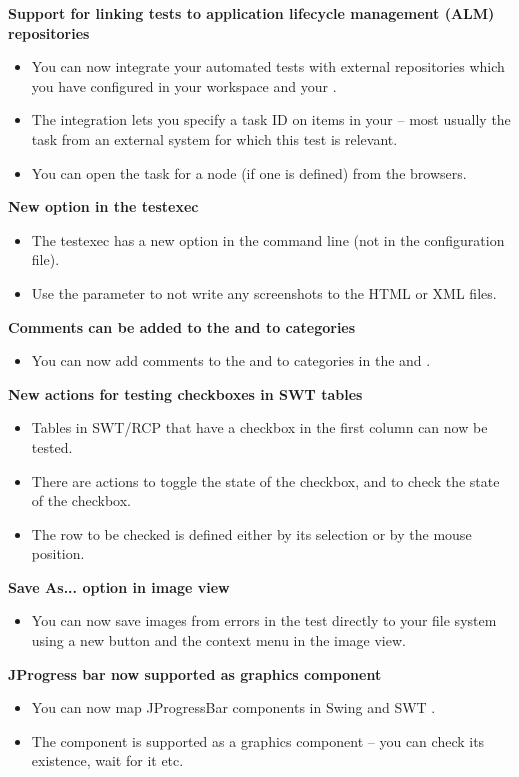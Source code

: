\textbf{Support for linking tests to application lifecycle management (ALM) repositories}
\begin{itemize}
\item You can now integrate your automated tests with external repositories which you have configured in your workspace and your \gdproject{}.
\item The integration lets you specify a task ID on items in your \gdproject{} -- most usually the task from an external system for which this test is relevant. 
\item You can open the task for a node (if one is defined) from the browsers.  
\end{itemize}

\textbf{New option in the testexec}
\begin{itemize}
\item The testexec has a new option in the command line (not in the configuration file).
\item Use the parameter  to not write any screenshots to the HTML or XML files.
\end{itemize}

\textbf{Comments can be added to the \gdproject{} and to categories}
\begin{itemize}
\item You can now add comments to the \gdproject{} and to categories in the \gdtestsuitebrowser{} and \gdtestcasebrowser{}.
\end{itemize}

\textbf{New actions for testing checkboxes in SWT tables}
\begin{itemize}
\item Tables in SWT/RCP \gdauts{} that have a checkbox in the first column can now be tested.
\item There are actions to toggle the state of the checkbox, and to check the state of the checkbox.
\item The row to be checked is defined either by its selection or by the mouse position.
\end{itemize}

\textbf{Save As... option in image view}
\begin{itemize}
\item You can now save images from errors in the test directly to your file system  using a new button and the context menu in the image view.
\end{itemize}

\textbf{JProgress bar now supported as graphics component}
\begin{itemize}
\item You can now map JProgressBar components in Swing and SWT \gdauts{}.
\item The component is supported as a graphics component -- you can check its existence, wait for it etc.
\end{itemize}

